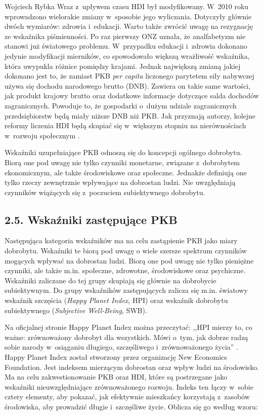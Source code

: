 \begin{artplenv}{Wojciech Rybka}
Wraz z~upływem czasu HDI był modyfikowany. W~2010 roku wprowadzono wielorakie zmiany w~sposobie jego wyliczania.
Dotyczyły głównie dwóch wymiarów: zdrowia i~edukacji. Warto także zwrócić uwagę na rezygnację ze wskaźnika
piśmienności. Po raz pierwszy ONZ uznała, że analfabetyzm nie stanowi już światowego problemu. W~przypadku
edukacji i~zdrowia dokonano jedynie modyfikacji mierników, co spowodowało większą wrażliwość wskaźnika, która uwypukla różnice
pomiędzy krajami. Jednak największą zmianą jakiej dokonano jest to, że zamiast PKB \textit{per capita} liczonego parytetem siły
nabywczej używa się dochodu narodowego brutto (DNB). Zawiera on takie same wartości, jak produkt krajowy brutto oraz
dodatkowe informacje dotyczące salda dochodów zagranicznych. Powoduje to, że gospodarki o~dużym udziale zagranicznych
przedsiębiorstw będą miały niższe DNB niż PKB. Jak przyznają autorzy, kolejne reformy liczenia HDI będą skupiać
się w~większym stopniu na nierównościach w~rozwoju społecznym
\parencite{antczak_nowe_2012}.


Wskaźniki uzupełniające PKB odnoszą się do koncepcji ogólnego dobrobytu. Biorą one pod uwagę nie tylko czynniki
monetarne, związane z~dobrobytem ekonomicznym, ale także środowiskowe oraz społeczne. Jednakże definiują one tylko
rzeczy zewnętrznie wpływające na dobrostan ludzi. Nie uwzględniają czynników wiążących się z~poczuciem subiektywnego
dobrobytu.

\subsection{2.5. Wskaźniki zastępujące PKB}
Następująca kategoria wskaźników ma na celu zastąpienie PKB jako miary dobrobytu. Wskaźniki te biorą pod uwagę o
wiele szersze spektrum czynników mogących wpływać na dobrostan ludzi. Biorą one pod uwagę nie tylko pieniężne czynniki,
ale także m.in. społeczne, zdrowotne, środowiskowe oraz psychiczne. Wskaźniki zaliczane do tej grupy skupiają się
głównie na dobrobycie subiektywnym. Do grupy wskaźników zastępujących zalicza się m.in. światowy wskaźnik szczęścia
(\textit{Happy Planet Index}, HPI) oraz wskaźnik dobrobytu subiektywnego (\textit{Subjective Well-Being}, SWB).

Na oficjalnej stronie Happy Planet Index można przeczytać: ,,HPI mierzy to, co ważne: zrównoważony dobrobyt dla
wszystkich. Mówi o~tym, jak dobrze radzą sobie narody w~osiąganiu długiego, szczęśliwego i~zrównoważonego życia''
\parencite{noauthor_about_2019}.
Happy Planet Index został stworzony przez organizację New Economics
Foundation. Jest indeksem mierzącym dobrostan oraz wpływ ludzi na środowisko. Ma na celu zakwestionowanie PKB oraz HDI,
które są postrzegane jako wskaźniki nieuwzględniające zrównoważonego rozwoju. Indeks ten łączy w~sobie cztery elementy,
aby pokazać, jak efektywnie mieszkańcy korzystają z~zasobów środowiska, aby prowadzić długie i~szczęśliwe życie. Oblicza
się go według wzoru:


\end{artplenv}
